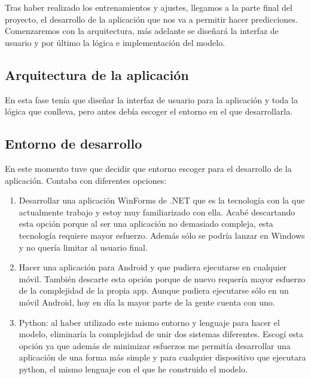 Tras haber realizado los entrenamientos y ajustes, llegamos a la parte final del proyecto, el desarrollo de la aplicación que nos va a permitir hacer predicciones. Comenzaremos con la arquitectura, más adelante se diseñará la interfaz de usuario y por último la lógica e implementación del modelo.

\subsection{Arquitectura de la aplicación}

En esta fase tenía que diseñar la interfaz de usuario para la aplicación y toda la lógica que conlleva, pero antes debía escoger el entorno en el que desarrollarla.

\subsection{Entorno de desarrollo}
En este momento tuve que decidir que entorno escoger para el desarrollo de la aplicación. Contaba con diferentes opciones:
\begin{enumerate}
    \item Desarrollar una aplicación WinForms de .NET que es la tecnología con la que actualmente trabajo y estoy muy familiarizado con ella. Acabé descartando esta opción porque al ser una aplicación no demasiado compleja, esta tecnología requiere mayor esfuerzo. Además sólo se podría lanzar en Windows y no quería limitar al usuario final. 
    \item Hacer una aplicación para Android y que pudiera ejecutarse en cualquier móvil. También descarte esta opción porque de nuevo requería mayor esfuerzo de la complejidad de la propia app. Aunque pudiera ejecutarse sólo en un móvil Android, hoy en día la mayor parte de la gente cuenta con uno.
    \item Python: al haber utilizado este mismo entorno y lenguaje para hacer el modelo, eliminaría la complejidad de unir dos sistemas diferentes. Escogí esta opción ya que además de minimizar esfuerzos me permitía desarrollar una aplicación de una forma más simple y para cualquier dispositivo que ejecutara python, el mismo lenguaje con el que he construido el modelo. 
\end{enumerate}

